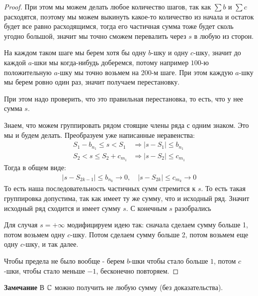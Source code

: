 \begin{proof}
    При этом мы можем делать любое количество шагов, так как $\sum b$ и $\sum c$ расходятся, поэтому мы можем
    выкинуть какое-то количество из начала и остаток будет все равно расходящимся, тогда его частичная сумма тоже будет сколь угодно большой,
    значит мы точно сможем перевалить через $s$ в любую из сторон.

    На каждом таком шаге мы берем хотя бы одну $b$-шку и одну $c$-шку, значит до каждой $a$-шки мы когда-нибудь доберемся, потому
    например $100$-ю положительную $a$-шку мы точно возьмем на 200-м шаге.
    При этом каждую $a$-шку мы берем ровно один раз, значит получаем перестановку.
    
    При этом надо проверить, что это правильная перестановка, то есть, что у нее сумма $s$.

    Знаем, что можем группировать рядом стоящие члены ряда с одним знаком. Это мы и будем делать. 
    Преобразуем уже написанные неравенства:
    \begin{align*}
        S_1 - b_{n_1} \leqslant s < S_1 &\Longrightarrow |s - S_1| \leqslant b_{n_1} \\
        S_2 < s \leqslant S_2 + c_{m_1} &\Longrightarrow |s - S_2| \leqslant c_{m_1}
    \end{align*}
    Тогда в общем виде:
    \begin{gather*}
        |s - S_{2k-1}| \leq b_{n_k} \to 0, \quad |s - S_{2k}| \leq c_{m_k} \to 0
    \end{gather*}
    То есть наша последовательность частичных сумм стремится к $s$. То есть такая группировка допустима, так как имеет ту же сумму, что и исходный ряд. 
    Значит исходный ряд сходится и имеет сумму $s$. С конечным $s$ разобрались

    Для случая $s = +\infty$ модифицируем идею так: сначала сделаем сумму больше 1, потом возьмем одну $c$-шку. Потом сделаем
    сумму больше 2, потом возьмем еще одну $c$-шку, и так далее. 
    
    Чтобы предела не было вообще - берем $b$-шки чтобы стало больше $1$,
    потом $c$-шки, чтобы стало меньше $-1$, бесконечно повторяем.
\end{proof}

\textbf{Замечание} В $\mathbb{C}$ можно получить не любую сумму (без доказательства).